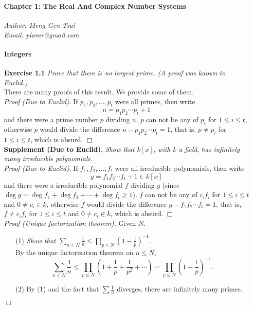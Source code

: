 \documentclass{article}
\begin{document}
\textbf{\Large Chapter 1: The Real And Complex Number Systems} \\\\



\emph{Author: Meng-Gen Tsai} \\
\emph{Email: plover@gmail.com} \\\\



\textbf{\large Integers} \\\\



\textbf{Exercise 1.1}
\emph{Prove that there is no largest prime. (A proof was known to Euclid.)} \\

There are many proofs of this result. We provide some of them. \\

\emph{Proof (Due to Euclid).}
If
$p_1, p_2, ..., p_t$ were all primes, then
write $$n = p_1 p_2 \cdots p_t + 1$$
and there were a prime number $p$ dividing $n$.
$p$ can not be any of $p_i$ for $1 \leq i \leq t$,
otherwise $p$ would divide the difference $n - p_1 p_2 \cdots p_t = 1$,
that is, $p \neq p_i$ for $1 \leq i \leq t$,
which is absurd.
$\Box$ \\

\textbf{Supplement (Due to Euclid).}
\emph{Show that $k[x]$, with $k$ a field,
has infinitely many irreducible polynomials.} \\

\emph{Proof (Due to Euclid).}
If
$f_1, f_2, ..., f_t$ were all irreducible polynomials, then
write $$g = f_1 f_2 \cdots f_t + 1 \in k[x]$$
and there were a irreducible polynomial $f$ dividing $g$
(since $\deg g = \deg f_1 + \deg f_2 + \cdots + \deg f_t \geq 1$).
$f$ can not be any of $c_i f_i$ for $1 \leq i \leq t$ and $0 \neq c_i \in k$,
otherwise $f$ would divide the difference $g - f_1 f_2 \cdots f_t = 1$,
that is, $f \neq c_i f_i$ for $1 \leq i \leq t$ and $0 \neq c_i \in k$,
which is absurd.
$\Box$ \\

\emph{Proof (Unique factorization theorem).}
Given $N$.
\begin{enumerate}
\item[(1)]
\emph{Show that $\sum_{n \leq N} \frac{1}{n}
\leq \prod_{p \leq N} \left( 1 - \frac{1}{p} \right)^{-1}$.} \\
By the unique factorization theorem on $n \leq N$,
$$\sum_{n \leq N} \frac{1}{n}
\leq \prod_{p \leq N} \left( 1 + \frac{1}{p} + \frac{1}{p^2} + \cdots \right)
= \prod_{p \leq N} \left( 1 - \frac{1}{p} \right)^{-1}.$$
\item[(2)]
By (1) and the fact that $\sum \frac{1}{n}$ diverges,
there are infinitely many primes.
\end{enumerate}
$\Box$ \\
\end{document}
